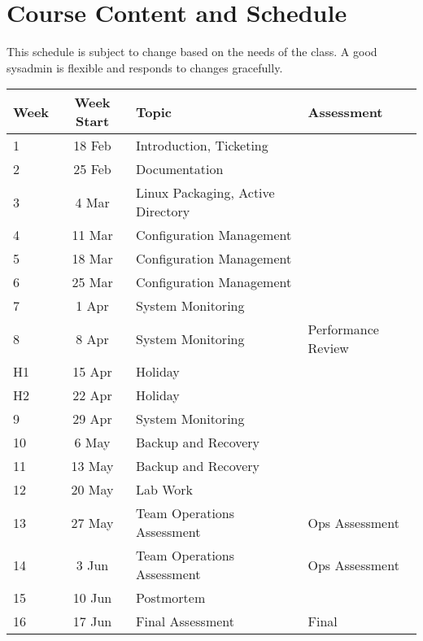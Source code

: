 \documentclass{article}
\begin{document}
\pagebreak

\section*{Course Content and Schedule}
This schedule is subject to change based on the needs of the class. A good sysadmin is flexible and responds to changes gracefully.

\renewcommand{\arraystretch}{1.5}
\begin{tabular}{|l|c|l|l|}
\hline
 Week & Week Start & Topic                              & Assessment         \\ \hline
 1    & 18 Feb     & Introduction, Ticketing            &                    \\ \hline
 2    & 25 Feb     & Documentation                      &                    \\ \hline
 3    &  4 Mar     & Linux Packaging, Active Directory  &                    \\ \hline
 4    &  11 Mar    & Configuration Management           &                    \\ \hline
 5    & 18 Mar     & Configuration Management           &                    \\ \hline
 6    & 25 Mar     & Configuration Management           &                    \\ \hline
 7    & 1 Apr      & System Monitoring                  &                    \\ \hline
 8    & 8 Apr     & System Monitoring                  & Performance Review \\ \hline
 H1   & 15 Apr     & Holiday                            &                    \\ \hline
 H2   & 22 Apr     & Holiday                            &                    \\ \hline
 9    &  29 Apr     & System Monitoring                  &                    \\ \hline
 10   &  6 May     & Backup and Recovery                &                    \\ \hline
 11   & 13 May     & Backup and Recovery                &                    \\ \hline
 12   & 20 May     & Lab Work                           &                    \\ \hline
 13   & 27 May     & Team Operations Assessment         &  Ops Assessment    \\ \hline
 14   &  3 Jun     & Team Operations Assessment         &  Ops Assessment    \\ \hline
 15   & 10 Jun     & Postmortem                         &                    \\ \hline
 16   & 17 Jun     & Final Assessment                   & Final              \\ \hline
\end{tabular}
\end{document}
